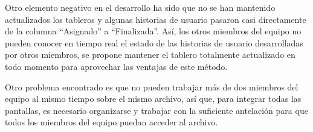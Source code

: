 \documentclass[11pt]{article}
\begin{document}
Otro elemento negativo en el desarrollo ha sido que no se han mantenido actualizados los tableros y algunas historias de usuario pasaron casi directamente de la columna ``Asignado'' a ``Finalizada''. Así, los otros miembros del equipo no pueden conocer en tiempo real el estado de las historias de usuario desarrolladas por otros miembros, se propone mantener el tablero totalmente actualizado en todo momento para aprovechar las ventajas de este método.

Otro problema encontrado es que no pueden trabajar más de dos miembros del equipo al mismo tiempo sobre el mismo archivo, así que, para integrar todas las pantallas, es necesario organizarse y trabajar con la suficiente antelación para que todos los miembros del equipo puedan acceder al archivo.\\
\end{document}
